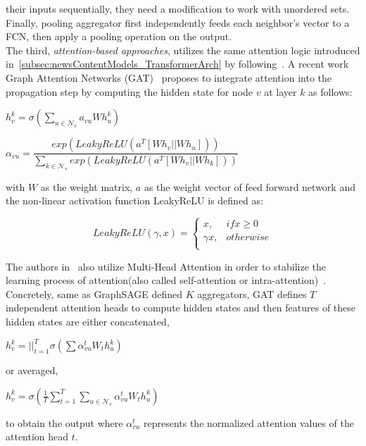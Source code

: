 their inputs sequentially, they need a modification to work with unordered sets. Finally, pooling aggregator first independently feeds each neighbor's vector to a FCN, then apply a pooling operation on the output.\\
The third, \emph{attention-based approaches}, utilizes the same attention logic introduced in~\ref{subsec:newsContentModels_TransformerArch} by following~\cite{NeuralMachineTranslationByJointlyLearning_Bahdanau}. A recent work Graph Attention Networks (GAT)~\parencite{GraphAttentionNetworks_Velickovic} proposes to integrate attention into the propagation step by computing the hidden state for node $v$ at layer $k$ as follows:
\begin{center}
    $h_v^{k} = \sigma(\sum_{u \in \mathcal{N}_v} a_{vu} W h_u^k)$ \\
\end{center}
\begin{center}
    $\alpha_{vu} = \dfrac{exp(LeakyReLU(a^T[Wh_v || Wh_u]))}{\sum_{k \in \mathcal{N}_v}exp(LeakyReLU(a^T[W h_v || W h_k]))}$
\end{center}
with $W$ as the weight matrix, $a$ as the weight vector of feed forward network and the non-linear activation function LeakyReLU is defined as:
\begin{center}
    \[LeakyReLU(\gamma, x) =
        \begin{cases}
            x,         & if x \geq 0 \\
            \gamma  x, & otherwise   \\
        \end{cases}
    \]
\end{center}
The authors in~\cite{GraphAttentionNetworks_Velickovic} also utilize Multi-Head Attention in order to stabilize the
learning process of attention(also called self-attention or intra-attention)~\parencite{AttentionIsAllYouNeed_Vaswani}. Concretely, same as GraphSAGE defined $K$ aggregators, GAT defines $T$ independent attention heads to compute hidden states and then features of these hidden states are either concatenated,
\begin{center}
    $h_v^k = ||_{t=1}^T \sigma(\sum \alpha_{vu}^t W_t h_u^k)$
\end{center}
or averaged,
\begin{center}
    $h_v^k = \sigma(\frac{1}{T} \sum_{t=1}^T \sum_{u \in \mathcal{N}_v} \alpha_{vu}^t W_t h_u^k)$
\end{center}
to obtain the output where $\alpha_{vu}^t$ represents the normalized attention values of the attention head $t$.\\
